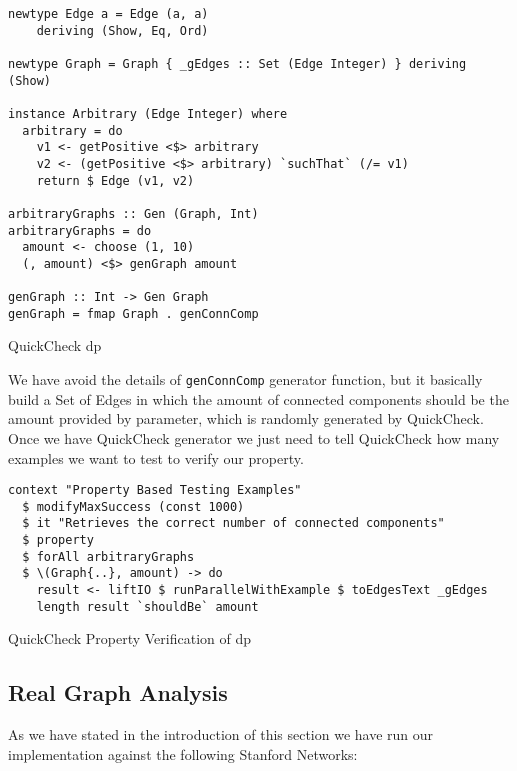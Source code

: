 \documentclass[12pt]{article}
\begin{document}
\begin{listing}[H]
  \begin{verbatim}      
newtype Edge a = Edge (a, a)
    deriving (Show, Eq, Ord)
  
newtype Graph = Graph { _gEdges :: Set (Edge Integer) } deriving (Show)
  
instance Arbitrary (Edge Integer) where
  arbitrary = do
    v1 <- getPositive <$> arbitrary
    v2 <- (getPositive <$> arbitrary) `suchThat` (/= v1)
    return $ Edge (v1, v2)
  
arbitraryGraphs :: Gen (Graph, Int)
arbitraryGraphs = do
  amount <- choose (1, 10)
  (, amount) <$> genGraph amount
  
genGraph :: Int -> Gen Graph
genGraph = fmap Graph . genConnComp
\end{verbatim}
\caption{QuickCheck \acrshort{dp}}
\label{src:haskell:7}
\end{listing}

We have avoid the details of \texttt{genConnComp} generator function, but it basically build a Set of Edges 
in which the amount of connected components should be the amount provided by parameter, which is randomly generated by QuickCheck.
Once we have QuickCheck generator we just need to tell QuickCheck how many examples we want to test to verify our property.

\begin{listing}[H]
\begin{verbatim}      
context "Property Based Testing Examples"
  $ modifyMaxSuccess (const 1000)
  $ it "Retrieves the correct number of connected components"
  $ property
  $ forAll arbitraryGraphs 
  $ \(Graph{..}, amount) -> do 
    result <- liftIO $ runParallelWithExample $ toEdgesText _gEdges
    length result `shouldBe` amount
\end{verbatim}
\caption{QuickCheck Property Verification of \acrshort{dp}}
\label{src:haskell:8}
\end{listing}

\subsection{Real Graph Analysis}
As we have stated in the introduction of this section we have run our implementation against the following Stanford Networks:
\end{document}

